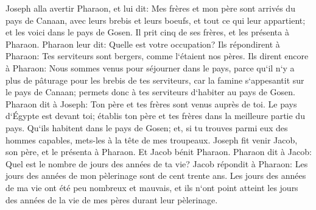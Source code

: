 \verse Joseph alla avertir Pharaon, et lui dit: Mes frères et mon père sont arrivés du pays de Canaan, avec leurs brebis et leurs boeufs, et tout ce qui leur appartient; et les voici dans le pays de Gosen. 
\verse Il prit cinq de ses frères, et les présenta à Pharaon. 
\verse Pharaon leur dit: Quelle est votre occupation? Ils répondirent à Pharaon: Tes serviteurs sont bergers, comme l`étaient nos pères. 
\verse Ils dirent encore à Pharaon: Nous sommes venus pour séjourner dans le pays, parce qu`il n`y a plus de pâturage pour les brebis de tes serviteurs, car la famine s`appesantit sur le pays de Canaan; permets donc à tes serviteurs d`habiter au pays de Gosen. 
\verse Pharaon dit à Joseph: Ton père et tes frères sont venus auprès de toi. 
\verse Le pays d`Égypte est devant toi; établis ton père et tes frères dans la meilleure partie du pays. Qu`ils habitent dans le pays de Gosen; et, si tu trouves parmi eux des hommes capables, mets-les à la tête de mes troupeaux. 
\verse Joseph fit venir Jacob, son père, et le présenta à Pharaon. Et Jacob bénit Pharaon. 
\verse Pharaon dit à Jacob: Quel est le nombre de jours des années de ta vie? 
\verse Jacob répondit à Pharaon: Les jours des années de mon pèlerinage sont de cent trente ans. Les jours des années de ma vie ont été peu nombreux et mauvais, et ils n`ont point atteint les jours des années de la vie de mes pères durant leur pèlerinage. 
